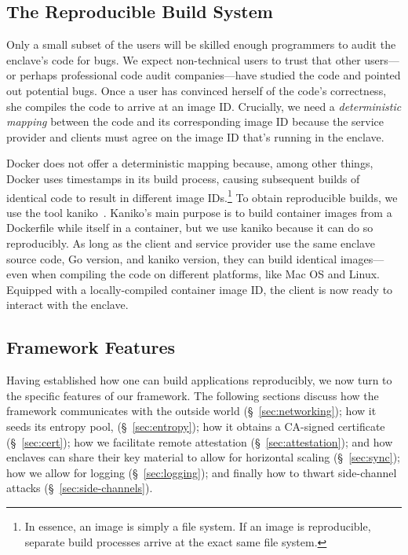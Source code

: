\subsection{The Reproducible Build System}
\label{sec:build-system}

Only a small subset of the users will be skilled enough programmers to audit the enclave's code for bugs.  We expect non-technical users to trust that other users---or perhaps professional code audit companies---have studied the code and pointed out potential bugs.  Once a user has convinced herself of the code's correctness, she compiles the code to arrive at an image ID.  Crucially, we need a \emph{deterministic mapping} between the code and its corresponding image ID because the service provider and clients must agree on the image ID that's running in the enclave.

Docker does not offer a deterministic mapping because, among other things, Docker uses timestamps in its build process, causing subsequent builds of identical code to result in different image IDs.\footnote{In essence, an image is simply a file system.  If an image is reproducible, separate build processes arrive at the exact same file system.}  To obtain reproducible builds, we use the tool kaniko~\cite{kaniko}.  Kaniko's main purpose is to build container images from a Dockerfile while itself in a container, but we use kaniko because it can do so reproducibly.  As long as the client and service provider use the same enclave source code, Go version, and kaniko version, they can build identical images---even when compiling the code on different platforms, like Mac OS and Linux.  Equipped with a locally-compiled container image ID, the client is now ready to interact with the enclave.

\subsection{Framework Features}
\label{sec:framework}

Having established how one can build applications reproducibly, we now turn to the specific features of our framework.  The following sections discuss how the framework communicates with the outside world (\S~\ref{sec:networking});
how it seeds its entropy pool, (\S~\ref{sec:entropy});
how it obtains a CA-signed certificate (\S~\ref{sec:cert});
how we facilitate remote attestation (\S~\ref{sec:attestation});
and how enclaves can share their key material to allow for horizontal scaling (\S~\ref{sec:sync});
how we allow for logging (\S~\ref{sec:logging});
and finally how to thwart side-channel attacks (\S~\ref{sec:side-channels}).

